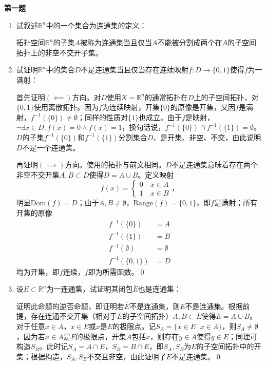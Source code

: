 \documentclass[10pt]{article}
\begin{document}
\begin{CJK*}{UTF8}{gbsn}
\newpage
\textbf{第一题}
\begin{enumerate}
\item 试叙述$\mathbb{R}^n$中的一个集合为连通集的定义：

拓扑空间$\mathbb{R}^n$的子集$A$被称为连通集当且仅当$A$不能被分割成两个在$A$的子空间拓扑上的非空不交开子集。

\item 试证明$\mathbb{R}^n$中的集合$D$不是连通集当且仅当存在连续映射$f:D\to\{0,1\}$使得$f$为一满射：

首先证明$(\impliedby)$方向。对$D$使用$X=\mathbb{R}^n$的通常拓扑在$D$上的子空间拓扑，对$\{0,1\}$使用离散拓扑。因为$f$为连续映射，开集$\{0\}$的原像是开集，又因$f$是满射，$f^{-1}(\{0\})\neq\emptyset$；同样的性质对$\{1\}$也成立。由于$f$是映射，$\lnot\exists x\in D.\, f(x)=0\land f(x)=1$，换句话说，$f^{-1}(\{0\})\cap f^{-1}(\{1\})=\emptyset$。$D$的子集$f^{-1}(\{0\})$和$f^{-1}(\{1\})$分割集合$D$、是开集、非空、不交，由此说明$D$不是一个连通集。

再证明$(\implies)$方向。使用的拓扑与前文相同。$D$不是连通集意味着存在两个非空不交开集$A,B\subset D$使得$D=A\cup B$。定义映射
$$
f(x)=\begin{cases}
0\quad x\in A\\
1\quad x\in B
\end{cases}，
$$
明显$\text{Dom}(f)=D$；由于$A,B\neq\emptyset$，$\text{Range}(f)=\{0,1\}$，即$f$是满射；所有开集的原像
\begin{align*}
f^{-1}(\{0\})&=A\\
f^{-1}(\{1\})&=B\\
f^{-1}(\emptyset)&=\emptyset\\
f^{-1}(\{0,1\})&=D
\end{align*}
均为开集，即$f$连续，$f$即为所需函数。\qed

\item 设$E\subset\mathbb{R}^n$为一连通集，试证明其闭包$\overline{E}$也是连通集：

证明此命题的逆否命题，即证明若$\overline{E}$不是连通集，则$E$不是连通集。根据前提，存在连通不交开集（相对于$\overline{E}$的子空间拓扑）$A,B\subset\overline{E}$使得$\overline{E}=A\cup B$。对于任意$x\in A$，$x\in E$或$x$是$E$的极限点。记$S_A=\{x\in E\,\big|\,x\in A\}$，则$S_A\neq\emptyset$，因为若$x\in A$是$E$的极限点，开集$A$包括$x$，则存在$y\in A$使得$y\in E$；同理可构造$S_B$。此时记$S_A=A\cap E$，$S_B=B\cap E$，即$S_A,S_B$为$E$的子空间拓扑中的开集；根据构造，$S_A,S_B$不交且非空，由此证明了$E$不是连通集。\qed

\end{enumerate}


\end{CJK*}
\end{document}
